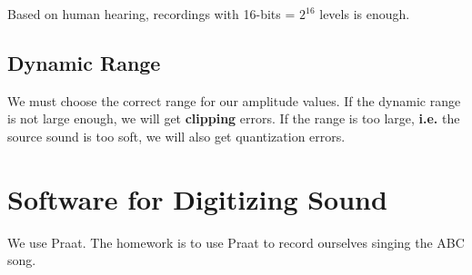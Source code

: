 \documentclass[12pt]{article}
\newcommand{\ie}{\textbf{i.e.}\xspace}
\begin{document}
Based on human hearing, recordings with 16-bits = $2^{16}$ levels is enough.

\subsection{Dynamic Range}

We must choose the correct range for our amplitude values. If the dynamic range
is not large enough, we will get \textbf{clipping} errors. If the range is too
large, \ie the source sound is too soft, we will also get quantization errors.

\section{Software for Digitizing Sound}

We use Praat. The homework is to use Praat to record ourselves singing the ABC
song.
\end{document}
